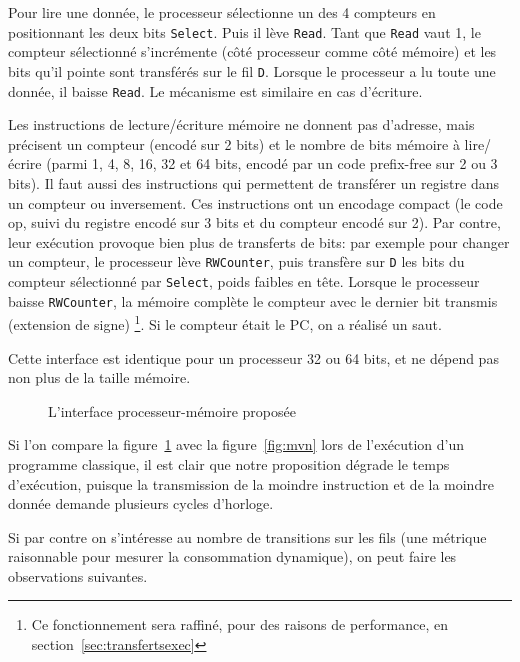 \documentclass[architecture]{compas2018}
\begin{document}
Pour lire une donnée, le processeur sélectionne un des 4 compteurs en positionnant les deux bits  \texttt{Select}.
Puis il lève \texttt{Read}.
Tant que \texttt{Read} vaut 1, le compteur sélectionné s'incrémente (côté processeur comme côté mémoire) et les bits qu'il pointe sont transférés sur le fil \texttt{D}.
Lorsque le processeur a lu toute une donnée, il baisse \texttt{Read}.
Le mécanisme est similaire en cas d'écriture.

Les instructions de lecture/écriture mémoire ne donnent pas d'adresse, mais précisent un compteur (encodé sur 2 bits) et le nombre de bits mémoire à lire/écrire (parmi 1, 4, 8, 16, 32 et 64 bits, encodé par un code prefix-free sur 2 ou 3 bits).
Il faut aussi des instructions qui permettent de transférer un registre dans un compteur ou inversement.
Ces instructions ont un encodage compact (le code op, suivi du registre encodé sur 3 bits et du compteur encodé sur 2).
Par contre, leur exécution provoque bien plus de transferts de bits: par exemple pour changer un compteur, le processeur lève \texttt{RWCounter}, puis transfère sur \texttt{D} les bits du compteur sélectionné par \texttt{Select}, poids faibles en tête.
Lorsque le processeur baisse \texttt{RWCounter}, la mémoire complète le compteur avec le dernier bit transmis (extension de signe) \footnote{Ce fonctionnement sera raffiné, pour des raisons de performance, en section~\ref{sec:transfertsexec}}.
Si le compteur était le PC, on a réalisé un saut.

Cette interface est identique pour un processeur 32 ou 64 bits, et ne dépend pas non plus de la taille mémoire.

\begin{figure}[b]
  \begin{center}
    \proco
  \end{center}
  \caption{L'interface processeur-mémoire proposée}
  \label{fig:overview}
\end{figure}

\iffalse
Si l'on compare la figure~\ref{fig:overview} avec la figure~\ref{fig:mvn} lors de l'exécution d'un programme classique, il est clair que notre proposition dégrade le temps d'exécution, puisque la transmission de la moindre instruction et de la moindre donnée demande plusieurs cycles d'horloge.

Si par contre on s'intéresse au nombre de transitions sur les fils (une métrique raisonnable pour mesurer la consommation dynamique), on peut faire les observations suivantes.
\end{document}
